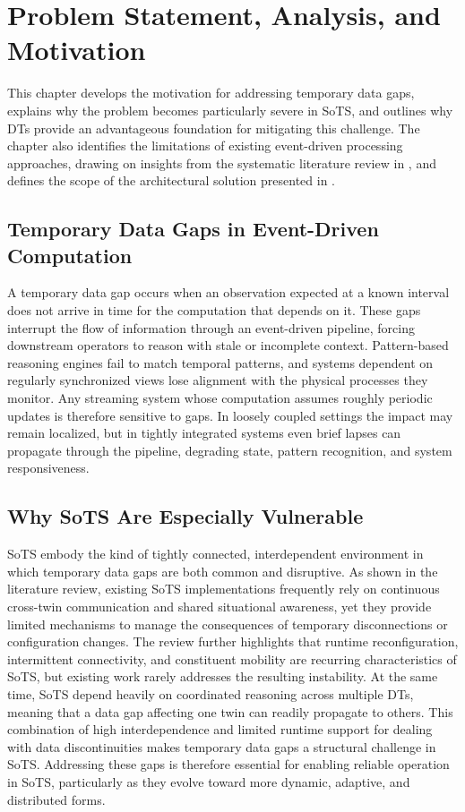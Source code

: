 \chapter{Problem Statement, Analysis, and Motivation}
\label{ch:motivation}
This chapter develops the motivation for addressing temporary data gaps, explains why the problem becomes particularly severe in SoTS, and outlines why DTs provide an advantageous foundation for mitigating this challenge. The chapter also identifies the limitations of existing event-driven processing approaches, drawing on insights from the systematic literature review in , and defines the scope of the architectural solution presented in .

\section{Temporary Data Gaps in Event-Driven Computation}

A temporary data gap occurs when an observation expected at a known interval does not arrive in time for the computation that depends on it. These gaps interrupt the flow of information through an event-driven pipeline, forcing downstream operators to reason with stale or incomplete context. Pattern-based reasoning engines fail to match temporal patterns, and systems dependent on regularly synchronized views lose alignment with the physical processes they monitor. Any streaming system whose computation assumes roughly periodic updates is therefore sensitive to gaps. In loosely coupled settings the impact may remain localized, but in tightly integrated systems even brief lapses can propagate through the pipeline, degrading state, pattern recognition, and system responsiveness.

\section{Why SoTS Are Especially Vulnerable}

SoTS embody the kind of tightly connected, interdependent environment in which temporary data gaps are both common and disruptive. As shown in the literature review, existing SoTS implementations frequently rely on continuous cross-twin communication and shared situational awareness, yet they provide limited mechanisms to manage the consequences of temporary disconnections or configuration changes. The review further highlights that runtime reconfiguration, intermittent connectivity, and constituent mobility are recurring characteristics of SoTS, but existing work rarely addresses the resulting instability. At the same time, SoTS depend heavily on coordinated reasoning across multiple DTs, meaning that a data gap affecting one twin can readily propagate to others. This combination of high interdependence and limited runtime support for dealing with data discontinuities makes temporary data gaps a structural challenge in SoTS. Addressing these gaps is therefore essential for enabling reliable operation in SoTS, particularly as they evolve toward more dynamic, adaptive, and distributed forms.

